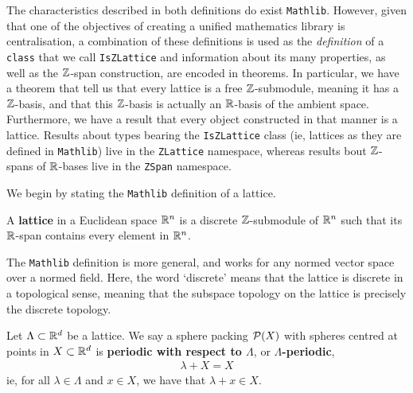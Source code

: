 The characteristics described in both definitions do exist \verb|Mathlib|. However, given that one of the objectives of creating a unified mathematics library is centralisation, a combination of these definitions is used as the \textit{definition} of a \verb|class| that we call \verb|IsZLattice| and information about its many properties, as well as the $\mathbb{Z}$-span construction, are encoded in theorems. In particular, we have a theorem that tell us that every lattice is a free $\mathbb{Z}$-submodule, meaning it has a $\mathbb{Z}$-basis, and that this $\mathbb{Z}$-basis is actually an $\mathbb{R}$-basis of the ambient space. Furthermore, we have a result that every object constructed in that manner is a lattice. Results about types bearing the \verb|IsZLattice| class (ie, lattices as they are defined in \verb|Mathlib|) live in the \verb|ZLattice| namespace, whereas results bout $\mathbb{Z}$-spans of $\mathbb{R}$-bases live in the \verb|ZSpan| namespace. 

We begin by stating the \verb|Mathlib| definition of a lattice.

\begin{boxdefinition}[Lattice]
    A \textbf{lattice} in a Euclidean space $\mathbb{R}^n$ is a discrete $\mathbb{Z}$-submodule of $\mathbb{R}^n$ such that its $\mathbb{R}$-span contains every element in $\mathbb{R}^n$.
\end{boxdefinition}

The \verb|Mathlib| definition is more general, and works for any normed vector space over a normed field. Here, the word `discrete' means that the lattice is discrete in a topological sense, meaning that the subspace topology on the lattice is precisely the discrete topology.

\begin{boxdefinition}
    Let $\Lambda \subset \mathbb{R}^d$ be a lattice. We say a sphere packing $\mathcal{P}(X)$ with spheres centred at points in $X \subset \mathbb{R}^d$ is \textbf{periodic with respect to $\Lambda$}, or \textbf{$\Lambda$-periodic},
    \begin{align*}
        \lambda + X = X
    \end{align*}
    ie, for all $\lambda \in \Lambda$ and $x \in X$, we have that $\lambda + x \in X$.
\end{boxdefinition}

